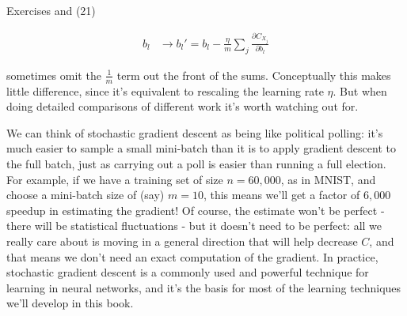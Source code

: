 \begin{exerciseBox}{Exercises}
\noindent and (21)

\begin{align*}
b_l &\rightarrow b_l' = b_l-\frac{\eta}{m} \sum_j \frac{\partial C_{X_j}}{\partial b_l} \nonumber
\end{align*}

\noindent sometimes omit the $\frac{1}{m}$ term out the front of the sums. Conceptually this makes little difference, since it's equivalent to rescaling the learning rate $\eta$. But when doing detailed comparisons of different work it's worth watching out for.


We can think of stochastic gradient descent as being like political polling: it's much easier to sample a small mini-batch than it is to apply gradient descent to the full batch, just as carrying out a poll is easier than running a full election. For example, if we have a training set of size $n = 60,000$, as in MNIST, and choose a mini-batch size of (say) $m = 10$, this means we'll get a factor of $6,000$ speedup in estimating the gradient! Of course, the estimate won't be perfect - there will be statistical fluctuations - but it doesn't need to be perfect: all we really care about is moving in a general direction that will help decrease $C$, and that means we don't need an exact computation of the gradient. In practice, stochastic gradient descent is a commonly used and powerful technique for learning in neural networks, and it's the basis for most of the learning techniques we'll develop in this book.

\end{exerciseBox}



